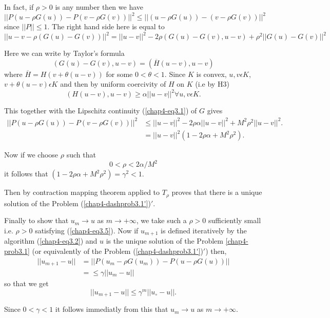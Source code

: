 In fact, if $\rho > 0$ is any number then we have
$$
|| P(u - \rho G(u)) - P(v - \rho G(v)) ||^{2} \leq || (u - \rho G(u)) - (v - \rho G(v)) ||^{2}
$$
since $|| P || \leq 1$. The right hand side here is equal to
{\fontsize{10}{12}\selectfont
$$
|| u - v - \rho (G(u) - G(v)) ||^{2} = || u-v ||^{2} - 2\rho (G(u) - G(v), u-v) + \rho^{2} ||G(u) - G(v) ||^{2} 
$$}

Here we can write by Taylor's formula
$$
(G(u) - G(v), u-v) = (\overline{H}(u-v), u-v)
$$\pageoriginale
where $\overline{H} = H(v+\theta(u-v))$ for some $0 < \theta < 1$. Since $K$ is convex, $u, v \epsilon K$, $v + \theta(u-v) \epsilon K$ and then by uniform coercivity of $H$ on $K$ (i.e by H3)
$$
(H(u-v), u-v) \geq \alpha ||u-v||^{2} \forall u, v \epsilon K.
$$

This together with the Lipschitz continuity (\ref{chap4-eq3.1}) of $G$ gives
{\fontsize{10}{12}\selectfont
\begin{align*}
|| P(u - \rho G(u)) - P(v-\rho G(v)) ||^{2} & \leq ||u-v||^{2} -2\rho \alpha ||u-v||^{2} + M^{2} \rho^{2} ||u-v||^{2}.\\
& = ||u-v||^{2} (1-2 \rho \alpha + M^{2} \rho^{2}).
\end{align*}}

Now if we choose $\rho$ such that
\begin{equation*}
0 < \rho < 2\alpha / M^{2}\tag{3.5}\label{chap4-eq3.5}
\end{equation*}
it follows that $(1-2 \rho \alpha + M^{2} \rho^{2}) = \gamma^{2} < 1$.

Then by contraction mapping theorem applied to $T_{\rho}$ proves that there is a unique solution of the Problem (\ref{chap4-dashprob3.1'})$'$.

Finally to show that $u_{m} \to u$ as $m \to + \infty$, we take such a $\rho > 0$ sufficiently small i.e. $\rho > 0$ satisfying (\ref{chap4-eq3.5}). Now if $u_{m+1}$ is defined iteratively by the algorithm (\ref{chap4-eq3.2}) and $u$ is the unique solution of the Problem \ref{chap4-prob3.1} (or equivalently of the Problem (\ref{chap4-dashprob3.1'})$'$) then,
\begin{align*}
|| u_{m+1} - u || & = || P(u_{m} - \rho G(u_{m})) - P(u - \rho G(u)) ||\\ 
& = \leq \gamma || u_{m} - u ||
\end{align*}
so that we get
$$
|| u_{m+1} - u || \leq \gamma^{m} || u_{\circ} - u ||.
$$

Since $0 < \gamma < 1$ it follows immediatly from this that $u_{m} \to u$ as $m \to + \infty$. 

